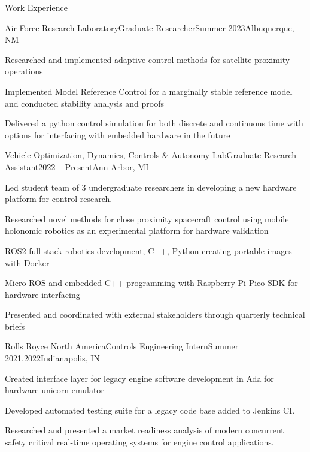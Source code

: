 \documentclass[]{jheidegger-resume}
\begin{document}
\begin{section}{Work Experience}
    \begin{subsection}{Air Force Research Laboratory}{Graduate Researcher}{Summer 2023}{Albuquerque, NM}
        \item Researched and implemented adaptive control methods for satellite proximity operations
        \item Implemented Model Reference Control for a marginally stable reference model and conducted stability analysis and proofs
        \item Delivered a python control simulation for both discrete and continuous time with options for interfacing with embedded hardware in the future
    \end{subsection}
    \begin{subsection}{Vehicle Optimization, Dynamics, Controls \& Autonomy Lab}{Graduate Research Assistant}{2022 -- Present}{Ann Arbor, MI}
        \item Led student team of 3 undergraduate researchers in developing a new hardware platform for control research.
        \item Researched novel methods for close proximity spacecraft control using mobile holonomic robotics as an experimental platform for hardware validation
        \item ROS2 full stack robotics development, C++, Python creating portable images with Docker
        \item Micro-ROS and embedded C++ programming with Raspberry Pi Pico SDK for hardware interfacing
        \item Presented and coordinated with external stakeholders through quarterly technical briefs
    \end{subsection}
    
    \begin{subsection}{Rolls Royce North America}{Controls Engineering Intern}{Summer 2021,2022}{Indianapolis, IN}
        \item Created interface layer for legacy engine software development in Ada for hardware unicorn emulator
        \item Developed automated testing suite for a legacy code base added to  Jenkins CI.
        \item Researched and presented a market readiness analysis of modern concurrent safety critical real-time operating systems for engine control applications. 
    \end{subsection}
    
\end{section}
\end{document}

